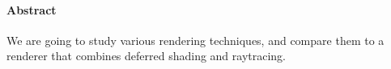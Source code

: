 \paragraph{Abstract}

We are going to study various rendering techniques, and compare them to a renderer that combines deferred shading and raytracing.
